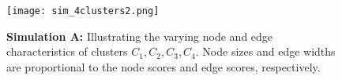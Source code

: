 	\begin{figure}[!hbt]
				\centering
				\texttt{[image: sim\_4clusters2.png]}		
				\caption{{\bf Simulation A:} Illustrating the varying node and edge characteristics of clusters $C_1, C_2, C_3, C_4$. Node sizes and edge widths are proportional to the node scores and edge scores, respectively.}
				\label{simA}
			\end{figure} 
